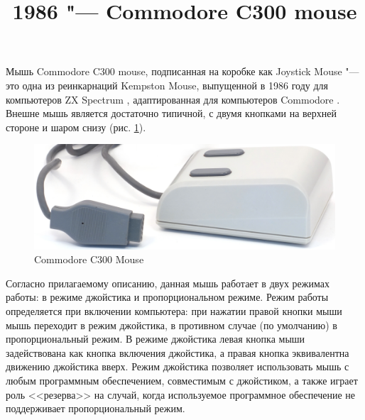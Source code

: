 \documentclass[11pt, a4paper]{article}
\begin{document}
\title{1986 "--- Commodore C300 mouse}
\date{}
\maketitle

Мышь Commodore C300 mouse, подписанная на коробке как Joystick Mouse "--- это одна из реинкарнаций Kempston Mouse, выпущенной в 1986 году для компьютеров ZX Spectrum \cite{SinclairUser}, адаптированная для компьютеров Commodore \cite{c64wiki}. Внешне мышь является достаточно типичной, с двумя кнопками на верхней стороне и шаром снизу (рис. \ref{fig:C300Pic}).

\begin{figure}[h]
    \centering
    \includegraphics[scale=0.7]{1986_commodore_c300_mouse/cmnirm_30.jpg}
    \caption{Commodore C300 Mouse}
    \label{fig:C300Pic}
\end{figure}

Согласно прилагаемому описанию, данная мышь работает в двух режимах работы: в режиме джойстика и пропорциональном режиме. Режим работы определяется при включении компьютера: при нажатии правой кнопки мыши мышь переходит в режим джойстика, в противном случае (по умолчанию) в пропорциональный режим. В режиме джойстика левая кнопка мыши задействована как кнопка включения джойстика, а правая кнопка эквивалентна движению джойстика вверх. Режим джойстика позволяет использовать мышь с любым программным обеспечением, совместимым с джойстиком, а также играет роль <<резерва>> на случай, когда используемое программное обеспечение не поддерживает пропорциональный режим.
\end{document}
